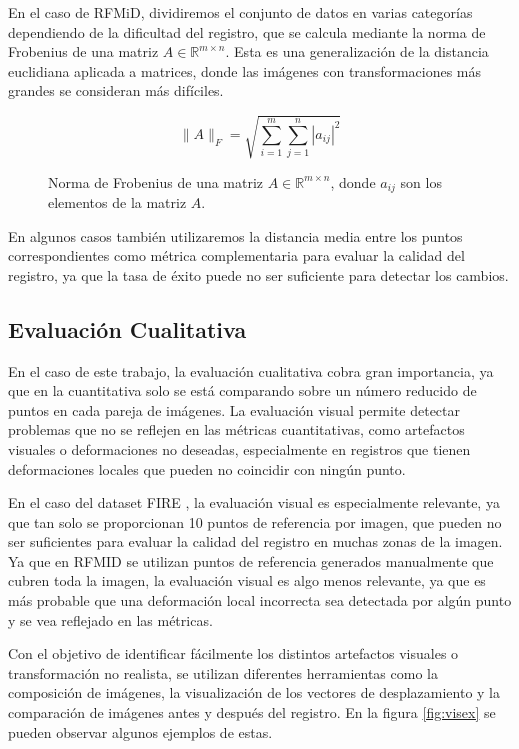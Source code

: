 En el caso de RFMiD, dividiremos el conjunto de datos en varias categorías dependiendo de la dificultad del registro, que se calcula mediante la norma de Frobenius de una matriz $A \in \mathbb{R}^{m \times n}$.
Esta es una generalización de la distancia euclidiana aplicada a matrices, donde las imágenes con transformaciones más grandes se consideran más difíciles.

\begin{figure}[tbp]
    \centering
    \[
    \|A\|_F = \sqrt{\sum_{i=1}^{m} \sum_{j=1}^{n} |a_{ij}|^2}
    \]
    \caption{Norma de Frobenius de una matriz $A \in \mathbb{R}^{m \times n}$, donde $a_{ij}$ son los elementos de la matriz $A$.}
    \label{fig:frobenius_norm}
\end{figure}

En algunos casos también utilizaremos la distancia media entre los puntos correspondientes como métrica complementaria para evaluar la calidad del registro, ya que la tasa de éxito puede no ser suficiente para detectar los cambios.

\subsection{Evaluación Cualitativa}
\label{subsec:Avaliación Cualitativa}

En el caso de este trabajo, la evaluación cualitativa cobra gran importancia, ya que en la cuantitativa solo se está comparando sobre un número reducido de puntos en cada pareja de imágenes.
La evaluación visual permite detectar problemas que no se reflejen en las métricas cuantitativas, como artefactos visuales o deformaciones no deseadas,
especialmente en registros que tienen deformaciones locales que pueden no coincidir con ningún punto.

En el caso del dataset FIRE \cite{FIRE}, la evaluación visual es especialmente relevante, ya que tan solo se proporcionan 10 puntos de referencia por imagen, que pueden no ser suficientes para evaluar la calidad del registro en muchas zonas de la imagen.
Ya que en RFMID \cite{RFMiD} se utilizan puntos de referencia generados manualmente que cubren toda la imagen, la evaluación visual es algo menos relevante, ya que es más probable que una deformación local incorrecta sea detectada por algún punto y se vea reflejado en las métricas.

Con el objetivo de identificar fácilmente los distintos artefactos visuales o transformación no realista, se utilizan diferentes herramientas como la composición de imágenes, la visualización de los vectores de desplazamiento y la comparación de imágenes antes y después del registro.
En la figura \ref{fig:visex} se pueden observar algunos ejemplos de estas.

